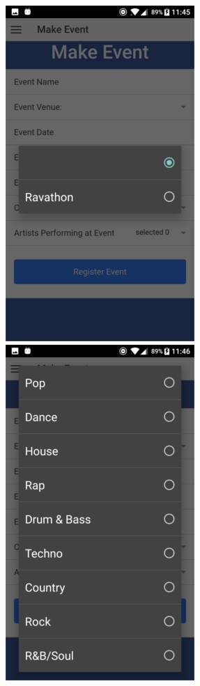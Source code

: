 \begin{figure}[H]
\includegraphics[scale=0.5]{images/sc16}
\includegraphics[scale=0.5]{images/sc17}

\end{figure}
